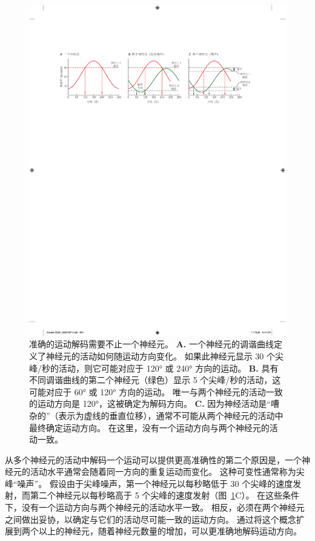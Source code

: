\begin{figure}[htbp]
	\centering
	\includegraphics[width=0.9\linewidth]{chap39/fig_39_4}
	\caption{准确的运动解码需要不止一个神经元。
		\textbf{A.} 一个神经元的调谐曲线定义了神经元的活动如何随运动方向变化。
		如果此神经元显示 30 个尖峰/秒的活动，则它可能对应于 120° 或 240° 方向的运动。 
		\textbf{B.} 具有不同调谐曲线的第二个神经元（绿色）显示 5 个尖峰/秒的活动，这可能对应于 60° 或 120° 方向的运动。
		唯一与两个神经元的活动一致的运动方向是 120°，这被确定为解码方向。
		\textbf{C.} 因为神经活动是“嘈杂的”（表示为虚线的垂直位移），通常不可能从两个神经元的活动中最终确定运动方向。
		在这里，没有一个运动方向与两个神经元的活动一致。}
	\label{fig:39_4}
\end{figure}


从多个神经元的活动中解码一个运动可以提供更高准确性的第二个原因是，一个神经元的活动水平通常会随着同一方向的重复运动而变化。
这种可变性通常称为尖峰“噪声”。
假设由于尖峰噪声，第一个神经元以每秒略低于 30 个尖峰的速度发射，而第二个神经元以每秒略高于 5 个尖峰的速度发射（图~\ref{fig:39_4}C）。
在这些条件下，没有一个运动方向与两个神经元的活动水平一致。
相反，必须在两个神经元之间做出妥协，以确定与它们的活动尽可能一致的运动方向。
通过将这个概念扩展到两个以上的神经元，随着神经元数量的增加，可以更准确地解码运动方向。



